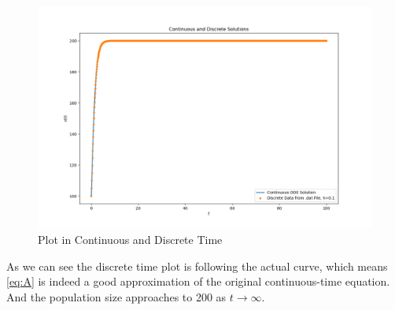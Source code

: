 \documentclass[journal,12pt,twocolumn]{IEEEtran}
\theoremstyle{remark}
\begin{document}
\begin{figure}[h]
    \centering
    \includegraphics[width=\columnwidth]{2023/BM/36/figs/diff.png}
    \caption{Plot in Continuous and Discrete Time}
\end{figure}
\newline
As we can see the discrete time plot is following the actual curve, which means \eqref{eq:A} is indeed a good approximation of the original continuous-time equation.
\newline
And the population size approaches to 200 as $t \rightarrow \infty$.
\end{document}
